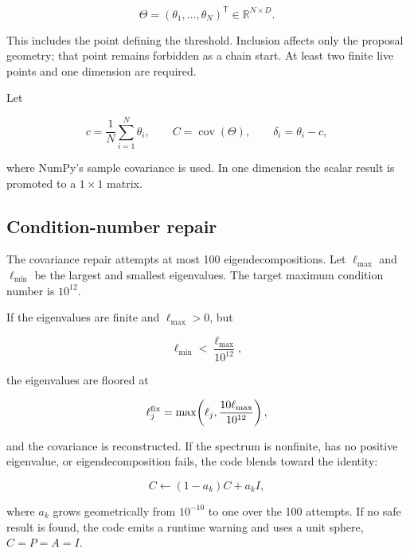 \documentclass[11pt,a4paper]{article}
\newcommand{\R}{\mathbb{R}}
\begin{document}
\begin{equation}
  \Theta=(\theta_1,\ldots,\theta_N)^\mathsf{T}\in\R^{N\times D}.
\end{equation}

This includes the point defining the threshold.  Inclusion affects only the
proposal geometry; that point remains forbidden as a chain start.  At least
two finite live points and one dimension are required.

Let

\begin{equation}
  c=\frac{1}{N}\sum_{i=1}^{N}\theta_i,
  \qquad
  C=\operatorname{cov}(\Theta),
  \qquad
  \delta_i=\theta_i-c,
\end{equation}

where NumPy's sample covariance is used.  In one dimension the scalar result
is promoted to a \(1\times1\) matrix.

\subsection{Condition-number repair}

The covariance repair attempts at most 100 eigendecompositions.  Let
\(\ell_{\max}\) and \(\ell_{\min}\) be the largest and smallest eigenvalues.
The target maximum condition number is \(10^{12}\).

If the eigenvalues are finite and \(\ell_{\max}>0\), but

\begin{equation}
  \ell_{\min}<\frac{\ell_{\max}}{10^{12}},
\end{equation}

the eigenvalues are floored at

\begin{equation}
  \ell_j^{\rm fix}
  =\max\!\left(\ell_j,\frac{10\ell_{\max}}{10^{12}}\right),
\end{equation}

and the covariance is reconstructed.  If the spectrum is nonfinite, has no
positive eigenvalue, or eigendecomposition fails, the code blends toward the
identity:

\begin{equation}
  C\leftarrow(1-a_k)C+a_k I,
\end{equation}

where \(a_k\) grows geometrically from \(10^{-10}\) to one over the 100
attempts.  If no safe result is found, the code emits a runtime warning and
uses a unit sphere, \(C=P=A=I\).
\end{document}
